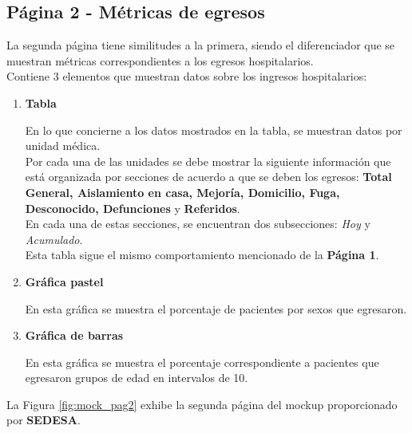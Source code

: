 \subsection{Página 2 - Métricas de egresos}

La segunda página tiene similitudes a la primera, siendo el diferenciador que se muestran métricas correspondientes a los egresos hospitalarios.\\

Contiene 3 elementos que muestran datos sobre los ingresos hospitalarios:


\begin{enumerate}
    \item \textbf{Tabla}
    
    En lo que concierne a los datos mostrados en la tabla, se muestran datos por unidad médica. \\
    Por cada una de las unidades se debe mostrar la siguiente información que está organizada por secciones de acuerdo a que se deben los egresos: \textbf{Total General, Aislamiento en casa, Mejoría, Domicilio, Fuga, Desconocido, Defunciones} y \textbf{Referidos}.\\
    En cada una de estas secciones, se encuentran dos subsecciones: \textit{Hoy} y \textit{Acumulado}.\\

    Esta tabla sigue el mismo comportamiento mencionado de la \textbf{Página 1}.
     
    \item \textbf{Gráfica pastel}

    En esta gráfica se muestra el porcentaje de pacientes por sexos que egresaron.
    
    \item \textbf{Gráfica de barras}

    En esta gráfica se muestra el porcentaje correspondiente a pacientes que egresaron grupos de edad en intervalos de 10.
\end{enumerate}

La Figura \ref{fig:mock_pag2} exhibe la segunda página del mockup proporcionado por \textbf{SEDESA}.

